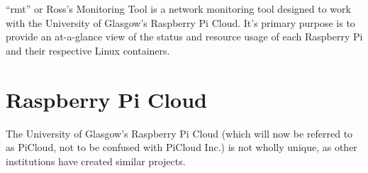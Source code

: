 ``rmt'' or Ross's Monitoring Tool is a network monitoring tool 
designed to work with the University of Glasgow's Raspberry Pi 
Cloud. It's primary purpose is to provide an at-a-glance view of the 
status and resource usage of each Raspberry Pi and their respective 
Linux containers.

\section{Raspberry Pi Cloud}
\label{intro:picloud}

The University of Glasgow's Raspberry Pi Cloud \cite{glapicloud} (which will now be 
referred to as PiCloud, not to be confused with PiCloud Inc.) is not 
wholly unique, as other institutions have created similar projects.

